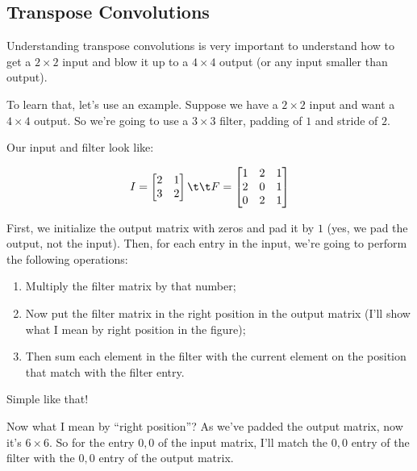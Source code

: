 \documentclass[12pt, a4paper, oneside]{book}
\begin{document}
\subsection{Transpose Convolutions}%
\label{sub:transpose_convolutions}

Understanding transpose convolutions is very important to understand how to get
a $2\times 2$ input and blow it up to a $4\times 4$ output (or any input smaller
than output).

To learn that, let's use an example. Suppose we have a $2\times 2$ input and
want a $4\times 4$ output. So we're going to use a $3\times 3$ filter, padding
of $1$ and stride of $2$.

Our input and filter look like:

\[
I = \begin{bmatrix}
    2 & 1 \\ 3 & 2
\end{bmatrix}
\t\t
F = \begin{bmatrix}
    1 & 2 & 1 \\
    2 & 0 & 1 \\
    0 & 2 & 1
\end{bmatrix}
\]

First, we initialize the output matrix with zeros and pad it by $1$ (yes, we pad
the output, not the input).
Then, for each entry in the input, we're going to perform the following
operations:

\begin{enumerate}
    \item Multiply the filter matrix by that number;
    \item Now put the filter matrix in the right position in the output matrix
        (I'll show what I mean by right position in the figure);
    \item Then sum each element in the filter with the current element on the
        position that match with the filter entry.
\end{enumerate}

Simple like that!

Now what I mean by ``right position''? As we've padded the output matrix, now
it's $6\times 6$. So for the entry $0,0$ of the input matrix, I'll match the
$0,0$ entry of the filter with the $0,0$ entry of the output matrix.
\end{document}
